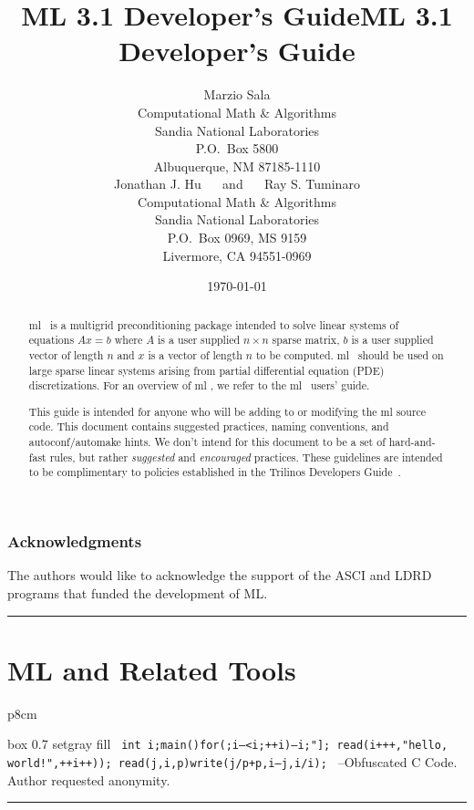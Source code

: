 \documentclass[10pt,letter,relax]{SANDreport}
\title{ML 3.1 Developer's Guide}
\title{ML 3.1 Developer's Guide}
\author{
Marzio  Sala \\
Computational Math \& Algorithms \\
Sandia National Laboratories\\
P.O.~Box 5800 \\
Albuquerque, NM 87185-1110\\[20pt]
Jonathan J. Hu $\quad$ and $\quad$
Ray S. Tuminaro \\
Computational Math \& Algorithms \\
Sandia National Laboratories\\
P.O.~Box 0969, MS 9159\\
Livermore, CA 94551-0969\\
}
\date{\today}
\newcommand{\HRule}{\noindent\rule{\linewidth}{1mm}}
\newcommand{\ML}     {{\sc ml }}
\begin{document}
\maketitle

\begin{abstract}
\ML\ is a multigrid preconditioning package intended to solve linear systems
 of equations $A x = b$ where $A$ is a user supplied $n \times n$ sparse
matrix, $b$ is a user supplied vector of length $n$ and $x$ is a vector of
length $n$ to be computed. \ML\ should be used on large sparse linear
systems arising from partial differential equation (PDE) discretizations.
For an overview of \ML, we refer to the \ML\ users' guide.

This guide is intended for anyone who will be adding to or modifying the \ML
source code.  This document contains suggested practices, naming conventions,
and autoconf/automake hints.  We don't intend for this document to be a set
of hard-and-fast rules, but rather {\em suggested} and {\em encouraged}
practices. These guidelines are intended to be complimentary to policies
established in the Trilinos Developers Guide~\cite{Trilinos-Dev-Guide}.
\end{abstract}

\clearpage

\section*{Acknowledgments}
The authors would like to acknowledge the support of the ASCI and LDRD 
programs that funded the development of ML.

\clearpage

\SANDmain

\tableofcontents

\clearpage
\newpage


\vspace*{3cm}
\HRule
\part{ML and Related Tools}
\bigskip

\hfill
\begin{tabular}{p{8cm}}
\begin{boxitpara}{box 0.7 setgray fill}
{\tt
        int
        i;main(){for(;i--<i;++i){--i;}"]; read(i+++,"hello,
          world!",++i++));} read(j,i,p){write(j/p+p,i---j,i/i);}
}
--Obfuscated C Code. Author requested anonymity. 
\end{boxitpara}
\end{tabular}
\HRule
\end{document}
